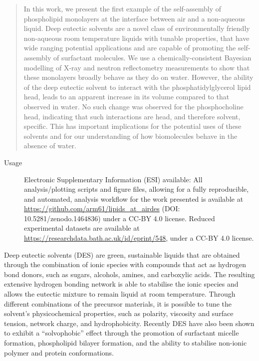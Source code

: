 \documentclass[amsmath,amssymb,twocolumn,superscriptaddress,prl]{revtex4-1}
\begin{document}
\begin{abstract}
  In this work, we present the first example of the self-assembly of
  phospholipid monolayers at the interface between air and a non-aqueous
  liquid.
  Deep eutectic solvents are a novel class of environmentally friendly
  non-aqueous room temperature liquids with tunable properties, that have
  wide ranging potential applications and are capable of promoting the
  self-assembly of surfactant molecules.
  We use a chemically-consistent Bayesian modelling of X-ray and neutron
  reflectometry measurements to show that these monolayers broadly behave
  as they do on water.
  However, the ability of the deep eutectic solvent to interact with the
  phosphatidylglycerol lipid head, leads to an apparent increase in its
  volume compared to that observed in water.
  No such change was observed for the phosphocholine head, indicating that
  such interactions are head, and therefore solvent, specific.
  This has important implications for the potential uses of these solvents
  and for our understanding of how biomolecules behave in the absence of water.
\end{abstract}

\maketitle

\begin{description}
\item[Usage]
Electronic Supplementary Information (ESI) available: All analysis/plotting
scripts and figure files, allowing for a fully reproducible, and automated,
analysis workflow for the work presented is available at
\url{https://github.com/arm61/lipids_at_airdes} (DOI: 10.5281/zenodo.1464836)
under a CC-BY 4.0 license.
Reduced experimental datasets are available at
\url{https://researchdata.bath.ac.uk/id/eprint/548}, under a CC-BY 4.0 license.
\end{description}


Deep eutectic solvents (DES) are green, sustainable liquids that are obtained
through the combination of ionic species with compounds that act as hydrogen
bond donors, such as sugars, alcohols, amines, and carboxylic
acids\cite{Smith2014,Dai2013}.
The resulting extensive hydrogen bonding network is able to stabilise the
ionic species and allows the eutectic mixture to remain liquid at room
temperature\cite{Hammond2016,Hammond2017,Araujo2017}.
Through different combinations of the precursor materials, it is possible to
tune the solvent's physicochemical properties, such as
polarity\cite{Pandey2014}, viscosity and surface tension\cite{Smith2014},
network charge\cite{Zahn2016}, and
hydrophobicity\cite{Ribeiro2015,vanOsch2015}.
Recently DES have also been shown to exhibit a ``solvophobic'' effect through
the promotion of surfactant micelle
formation\cite{Sanchez-Fernandez2016,Arnold2015,Hsieh2018,Banjare2018},
phospholipid bilayer formation\cite{Bryant2017,Bryant2016,Gutierrez2009}, and
the ability to stabilise non-ionic polymer\cite{Sapir2016} and protein
conformations\cite{Sanchez-Fernandez2017}.
\end{document}
